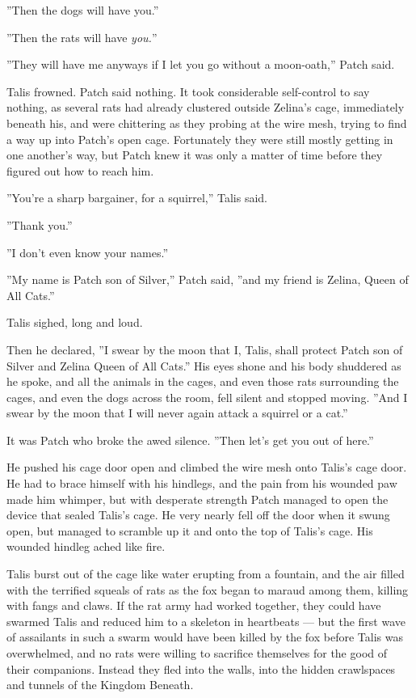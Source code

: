 \documentclass[12pt]{book}
\begin{document}
''Then the dogs will have you.''

''Then the rats will have {\it you.}''

''They will have me anyways if I let you go without a moon-oath,'' Patch said.

Talis frowned. Patch said nothing. It took considerable self-control to say nothing, as several rats had already clustered outside Zelina's cage, immediately beneath his, and were chittering as they probing at the wire mesh, trying to find a way up into Patch's open cage. Fortunately they were still mostly getting in one another's way, but Patch knew it was only a matter of time before they figured out how to reach him.

''You're a sharp bargainer, for a squirrel,'' Talis said.

''Thank you.''

''I don't even know your names.''

''My name is Patch son of Silver,'' Patch said, ''and my friend is Zelina, Queen of All Cats.''

Talis sighed, long and loud.

Then he declared, ''I swear by the moon that I, Talis, shall protect Patch son of Silver and Zelina Queen of All Cats.'' His eyes shone and his body shuddered as he spoke, and all the animals in the cages, and even those rats surrounding the cages, and even the dogs across the room, fell silent and stopped moving. ''And I swear by the moon that I will never again attack a squirrel or a cat.''

It was Patch who broke the awed silence. ''Then let's get you out of here.''

He pushed his cage door open and climbed the wire mesh onto Talis's cage door. He had to brace himself with his hindlegs, and the pain from his wounded paw made him whimper, but with desperate strength Patch managed to open the device that sealed Talis's cage. He very nearly fell off the door when it swung open, but managed to scramble up it and onto the top of Talis's cage. His wounded hindleg ached like fire.

Talis burst out of the cage like water erupting from a fountain, and the air filled with the terrified squeals of rats as the fox began to maraud among them, killing with fangs and claws. If the rat army had worked together, they could have swarmed Talis and reduced him to a skeleton in heartbeats ---
but the first wave of assailants in such a swarm would have been killed by the fox before Talis was overwhelmed, and no rats were willing to sacrifice themselves for the good of their companions. Instead they fled into the walls, into the hidden crawlspaces and tunnels of the Kingdom Beneath.
\end{document}
